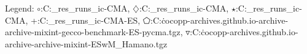 Legend: {\color{CornflowerBlue}$\circ$}:C:\Users\tristan\Documents\ppsn\BBOB\raw\_res\remaining\_runs\new\_ic\exdata\ICLB-CMA, {\color{Orange}$\diamondsuit$}:C:\Users\tristan\Documents\ppsn\BBOB\raw\_res\remaining\_runs\new\_ic\exdata\IC-CMA, {\color{Green}$\star$}:C:\Users\tristan\Documents\ppsn\BBOB\raw\_res\remaining\_runs\new\_ic\exdata\LB-CMA, {\color{red}+}:C:\Users\tristan\Documents\ppsn\BBOB\raw\_res\remaining\_runs\new\_ic\exdata\base-CMA-ES, {\color{magenta}$\pentagon$}:C:\Users\tristan\.cocopp\data-archives\numbbo.github.io\data-archive\data-archive\bbob-mixint-gecco-benchmark\CMA-ES-pycma.tgz, {\color{brown}$\triangledown$}:C:\Users\tristan\.cocopp\data-archives\numbbo.github.io\data-archive\data-archive\bbob-mixint\CMA-ESwM\_Hamano.tgz